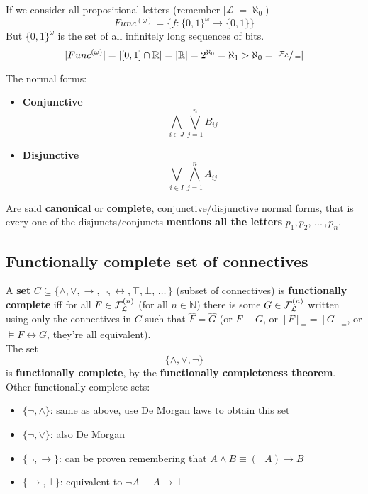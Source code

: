 \documentclass[11pt]{article}
\begin{document}
	If we consider all propositional letters (remember $|\mathcal{L}| = \aleph_0$)
	$$ Func^{(\omega)} = \{f: \{0,1\}^\omega \rightarrow \{0,1\}\}$$
	But $\{0,1\}^\omega$ is the set of all infinitely long sequences of bits.\\
	$$ |Func^{(\omega)}| = |[0,1] \cap \mathbb{R}| = |\mathbb{R}| = 2^{\aleph_0} = \aleph_1 > \aleph_0 = |\sfrac{\mathcal{F}_\mathcal{L}}{\equiv}| $$
	
	\vfill
	
	The normal forms: 
	\begin{itemize}
		\item \textbf{Conjunctive}
		$$ \bigwedge_{i \in J} \bigvee_{j=1}^n B_{ij} $$
		\item \textbf{Disjunctive} 
		$$ \bigvee_{i \in I} \bigwedge_{j=1}^n A_{ij} $$
	\end{itemize}
	
	Are said \textbf{canonical} or \textbf{complete}, conjunctive/disjunctive normal forms, that is every one of the disjuncts/conjuncts \textbf{mentions all the letters} $p_1, p_2, \, ... \, , p_n$.\\
	
%	

	
	\subsection{Functionally complete set of connectives}
	
	A \textbf{set} $C \subseteq \{\wedge, \vee, \rightarrow, \neg, \leftrightarrow, \top, \bot, \, \dots \, \}$ (subset of connectives) is \textbf{functionally complete} iff for all $F \in \mathcal{F}_\mathcal{L}^{(n)}$ (for all $n \in \mathbb{N}$) there is some $G \in \mathcal{F}_\mathcal{L}^{(n)}$ written using only the connectives in $C$ such that $\hat F = \hat G$ (or $F \equiv G$, or $[F]_\equiv = [G]_\equiv$, or $\models F \leftrightarrow G$, they're all equivalent).\\
	
	The set 
	$$ \{\wedge, \vee, \neg \}$$
	is \textbf{functionally complete}, by the \textbf{functionally completeness theorem}.\\
	
	Other functionally complete sets: 
	\begin{itemize}
		\item $\{\neg, \wedge\}$: same as above, use De Morgan laws to obtain this set
		\item $\{\neg, \vee\}$: also De Morgan
		\item $\{\neg, \rightarrow\}$: can be proven remembering that $A \wedge B \equiv (\neg A) \rightarrow B$
		\item $\{\rightarrow, \bot\}$: equivalent to $\neg A \equiv A \rightarrow \bot$
	\end{itemize}
	
\end{document}
